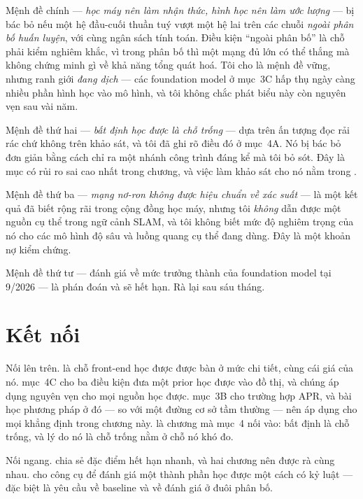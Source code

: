 \documentclass[../../vslam.tex]{subfiles}
\begin{document}
Mệnh đề chính --- \emph{học máy nên làm nhận thức, hình học nên làm ước lượng} --- bị bác bỏ nếu một hệ đầu-cuối thuần tuý vượt một hệ lai trên các chuỗi \emph{ngoài phân bố huấn luyện}, với cùng ngân sách tính toán. Điều kiện ``ngoài phân bố'' là chỗ phải kiểm nghiêm khắc, vì trong phân bố thì một mạng đủ lớn có thể thắng mà không chứng minh gì về khả năng tổng quát hoá. Tôi cho là mệnh đề vững, nhưng ranh giới \emph{đang dịch} --- các foundation model ở mục~3C hấp thụ ngày càng nhiều phần hình học vào mô hình, và tôi không chắc phát biểu này còn nguyên vẹn sau vài năm.

Mệnh đề thứ hai --- \emph{bất định học được là chỗ trống} --- dựa trên ấn tượng đọc rải rác chứ không trên khảo sát, và tôi đã ghi rõ điều đó ở mục~4A. Nó bị bác bỏ đơn giản bằng cách chỉ ra một nhánh công trình đáng kể mà tôi bỏ sót. Đây là mục có rủi ro sai cao nhất trong chương, và việc làm khảo sát cho nó nằm trong .

Mệnh đề thứ ba --- \emph{mạng nơ-ron không được hiệu chuẩn về xác suất} --- là một kết quả đã biết rộng rãi trong cộng đồng học máy, nhưng tôi \emph{không} dẫn được một nguồn cụ thể trong ngữ cảnh SLAM, và tôi không biết mức độ nghiêm trọng của nó cho các mô hình độ sâu và luồng quang cụ thể đang dùng. Đây là một khoản nợ kiểm chứng.

Mệnh đề thứ tư --- đánh giá về mức trưởng thành của foundation model tại 9/2026 --- là phán đoán và sẽ hết hạn. Rà lại sau sáu tháng.

\section{Kết nối}

Nối lên trên.  là chỗ front-end học được được bàn ở mức chi tiết, cùng cái giá của nó.  mục~4C cho ba điều kiện đưa một prior học được vào đồ thị, và chúng áp dụng nguyên vẹn cho mọi nguồn học được.  mục~3B cho trường hợp APR, và bài học phương pháp ở đó --- so với một đường cơ sở tầm thường --- nên áp dụng cho mọi khẳng định trong chương này.  là chương mà mục~4 nối vào: bất định là chỗ trống, và lý do nó là chỗ trống nằm ở chỗ nó khó đo.

Nối ngang.  chia sẻ đặc điểm hết hạn nhanh, và hai chương nên được rà cùng nhau.  cho công cụ để đánh giá một thành phần học được một cách có kỷ luật --- đặc biệt là yêu cầu về baseline và về đánh giá ở đuôi phân bố.
\end{document}
